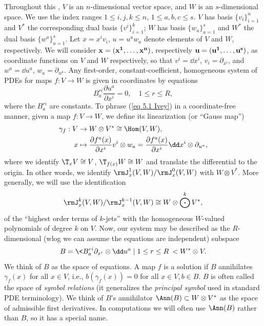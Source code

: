 Throughout this \chap, $V$ is an $n$-dimensional vector space, and $W$ is an $s$-dimensional space. We use the index ranges $1\leq i,j,k\leq n$, $1\leq a,b,c\leq s$. $V$ has basis $\{v_i\}_{i=1}^n$ and $V^\ast$ the corresponding dual basis $\{v^i\}_{i=1}^k$; $W$ has basis $\{w_a\}_{a=1}^s$ and $W^\ast$ the dual basis $\{w^a\}_{a=1}^s$.
Let $x=x^iv_i$, $u=u^aw_a$ denote elements of $V$ and $W$, respectively. We will consider $\bf{x}=(x^1,\ldots,x^n)$, respectively $\bf{u}=(u^1,\ldots,u^s)$, as coordinate functions on $V$ and $W$ respectively, so that $v^i=\dd x^i$, $v_i=\partial_{x^i}$, and $w^a=\dd u^a$, $w_a=\partial_{u^a}$. Any first-order, constant-coefficient, homogeneous system of PDEs for maps $f:V\to W$ is given in coordinates by equations
\[B_a^{ri}\frac{\partial u^a}{\partial x^i}=0,\quad 1\leq r\leq R,\label{eq 5.1 Ivey}\]
where the $B_a^{ri}$ are constants. 
To phrase (\ref{eq 5.1 Ivey}) in a coordinate-free manner, given a map $f:V\to W$, we define its linearization (or ``Gauss map'')
\begin{align}
    \gamma_f:V &\to W\otimes V^\ast\cong \Hom(V,W),\\
    x&\mapsto \frac{\partial f^a(x)}{\partial x^i}v^i\otimes w_a=\frac{\partial f^a(x)}{\partial x^i} \dd x^i\otimes \partial_{u^a},
\end{align}
where we identify $\T_xV\cong V$, $\T_{f(x)}W\cong W$ and translate the differential to the origin. In other words, we identify $\rmJ^1_x(V,W)\slash \rmJ^0_x(V,W)$ with $W\otimes V^\ast$. More generally, we will use the identification
\[\rmJ^k_x(V,W)\slash \rmJ^{k-1}_x(V,W)\cong W\otimes \bigodot^k V^\ast,\]
of the ``highest order terms of $k$-jets'' with the homogeneous $W$-valued polynomials of degree $k$ on $V$. Now, our system may be described as the $R$-dimensional (\gls{wlog} we can assume the equations are independent) subspace
\[B=\<B_a^{ri}\partial_{x^i}\otimes\dd u^a\mid 1\leq r\leq R\> < W^\ast\otimes V.\]
We think of $B$ as the space of equations. A map $f$ is a solution if $B$ annihilates $\gamma_f(x)$ for all $x\in V$, i.e., $b(\gamma_f(x))=0$ for all $x\in V,b\in B$.
$B$ is often called the space of \emph{symbol relations} (it generalizes the \emph{principal symbol} used in standard PDE terminology). We think of $B$'s annihilator $\Ann(B)\subset W\otimes V^\ast$ as the space of admissible first derivatives. In computations we will often use $\Ann(B)$ rather than $B$, so it has a special name.

